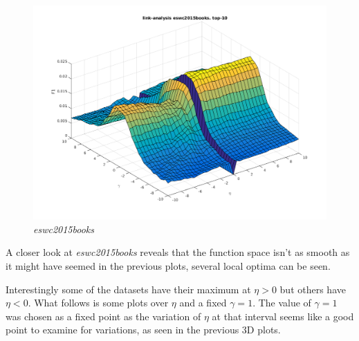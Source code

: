 \FloatBarrier

\begin{figure}[h!]
    \includegraphics[width=\textwidth]{fig/link_eta_gamma/eswc2015books_link.png}
    \caption{\textit{eswc2015books}}
\end{figure}

\FloatBarrier

A closer look at \textit{eswc2015books} reveals that the function space isn't as smooth as it might have seemed in the previous plots, several local optima can be seen.

\newpage

Interestingly some of the datasets have their maximum at $\eta > 0$ but others have $\eta < 0$. What follows is some plots over $\eta$ and a fixed $\gamma = 1$. The value of $\gamma = 1$ was chosen as a fixed point as the variation of $\eta$ at that interval seems like a good point to examine for variations, as seen in the previous 3D plots.

\FloatBarrier

